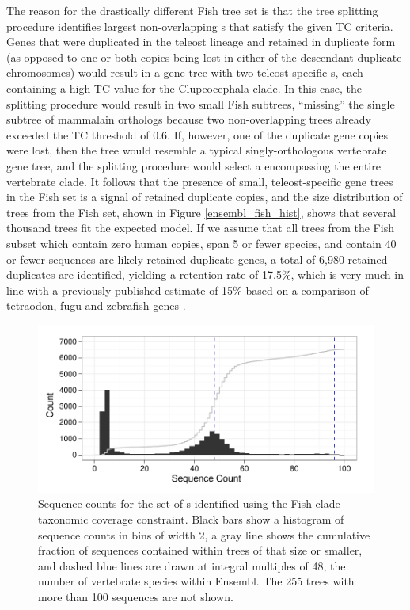 The reason for the drastically different Fish tree set is that the
tree splitting procedure identifies largest non-overlapping \subtr{}s
that satisfy the given TC criteria. Genes that were duplicated in the
teleost lineage and retained in duplicate form (as opposed to one or
both copies being lost in either of the descendant duplicate
chromosomes) would result in a gene tree with two teleost-specific
\subtr{}s, each containing a high TC value for the Clupeocephala
clade. In this case, the splitting procedure would result in two small
Fish subtrees, ``missing'' the single subtree of mammalain orthologs
because two non-overlapping trees already exceeded the TC threshold of
0.6. If, however, one of the duplicate gene copies were lost, then the
tree would resemble a typical singly-orthologous vertebrate gene tree,
and the splitting procedure would select a \subtr encompassing the
entire vertebrate clade. It follows that the presence of small,
teleost-specific gene trees in the Fish set is a signal of retained
duplicate copies, and the size distribution of trees from the Fish
set, shown in Figure \ref{ensembl_fish_hist}, shows that several
thousand trees fit the expected model. If we assume that all trees
from the Fish subset which contain zero human copies, span 5 or fewer
species, and contain 40 or fewer sequences are likely retained
duplicate genes, a total of 6,980 retained duplicates are identified,
yielding a retention rate of 17.5\%, which is very much in line with a
previously published estimate of 15\% based on a comparison of
tetraodon, fugu and zebrafish genes \citep{Brunet2006}.

\begin{figure}
\centering
\includegraphics[scale=0.9]{Figs/ensembl_fish_hist.pdf}
\caption{Sequence counts for the set of \subtr{}s identified using the
  Fish clade taxonomic coverage constraint. Black bars show a
  histogram of sequence counts in bins of width 2, a gray line shows
  the cumulative fraction of sequences contained within trees of that
  size or smaller, and dashed blue lines are drawn at integral
  multiples of 48, the number of vertebrate species within
  Ensembl. The 255 trees with more than 100 sequences are not shown.}
\label{ensembl_roots_hist}
\end{figure}


